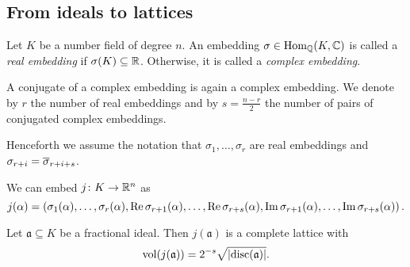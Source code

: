 \newpage

\subsection{From ideals to lattices}

\begin{definicija}
Let $K$ be a number field of degree $n$. An embedding
$\sigma \in \operatorname{Hom}_{\mathbb{Q}}(K, \mathbb{C})$ is called a
\emph{real embedding} if
$\sigma(K) \subseteq \mathbb{R}$. Otherwise, it is called a
\emph{complex embedding}.
\end{definicija}

\begin{opomba}
A conjugate of a complex embedding is again a complex embedding.
We denote by $r$ the number of real embeddings and by
$s = \frac{n-r}{2}$ the number of pairs of conjugated complex
embeddings.
\end{opomba}

\begin{opomba}
Henceforth we assume the notation that $\sigma_1, \dots, \sigma_r$
are real embeddings and $\sigma_{r+i} = \overline{\sigma}_{r+i+s}$.
\end{opomba}

\begin{opomba}
We can embed $j \colon K \to \mathbb{R}^n$ as
\[
j(\alpha) =
\left(\sigma_1(\alpha), \dots, \sigma_r(\alpha),
\operatorname{Re} \sigma_{r+1}(\alpha), \dots, \operatorname{Re} \sigma_{r+s}(\alpha),
\operatorname{Im} \sigma_{r+1}(\alpha), \dots, \operatorname{Im} \sigma_{r+s}(\alpha)\right).
\]
\end{opomba}

\begin{trditev}
Let $\mathfrak{a} \subseteq K$ be a fractional ideal. Then
$j(\mathfrak{a})$ is a complete lattice with
\[
\operatorname{vol}(j(\mathfrak{a})) = 2^{-s} \sqrt{\left\lvert \operatorname{disc}(\mathfrak{a})\right\rvert}.
\]
\end{trditev}

